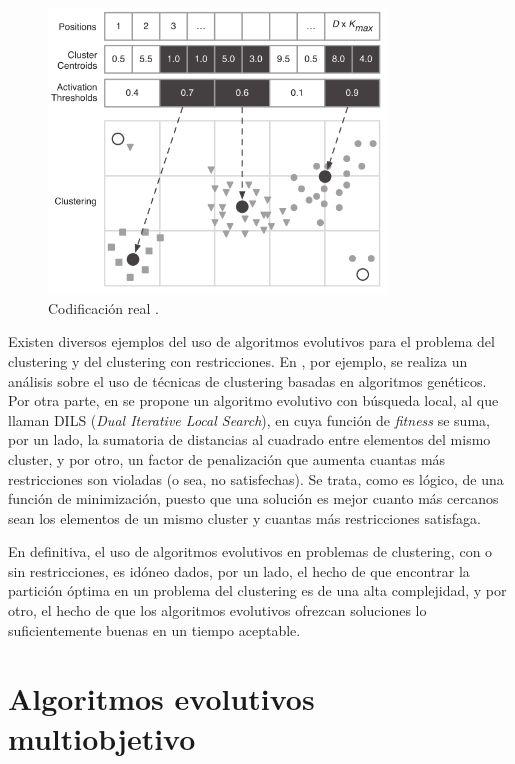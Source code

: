\begin{figure}
	\centering
	\includegraphics[width=0.8\textwidth]{Images/real}
	\caption[Codificación real.]{Codificación real \cite{jose2016automatic}.}
	\label{fig:realencod}
\end{figure}




Existen diversos ejemplos del uso de algoritmos evolutivos para el problema del clustering y del clustering con restricciones. En \cite{sheikh2008genetic}, por ejemplo, se realiza un análisis sobre el uso de técnicas de clustering basadas en algoritmos genéticos. Por otra parte, en \cite{gonzalez2020dils} se propone un algoritmo evolutivo con búsqueda local, al que llaman DILS (\emph{Dual Iterative Local Search}), en cuya función de \emph{fitness} se suma, por un lado, la sumatoria de distancias al cuadrado entre elementos del mismo cluster, y por otro, un factor de penalización que aumenta cuantas más restricciones son violadas (o sea, no satisfechas). Se trata, como es lógico, de una función de minimización, puesto que una solución es mejor cuanto más cercanos sean los elementos de un mismo cluster y cuantas más restricciones satisfaga.


En definitiva, el uso de algoritmos evolutivos en problemas de clustering, con o sin restricciones, es idóneo dados, por un lado, el hecho de que encontrar la partición óptima en un problema del clustering es de una alta complejidad, y por otro, el hecho de que los algoritmos evolutivos ofrezcan soluciones lo suficientemente buenas en un tiempo aceptable.

\section{Algoritmos evolutivos multiobjetivo}

